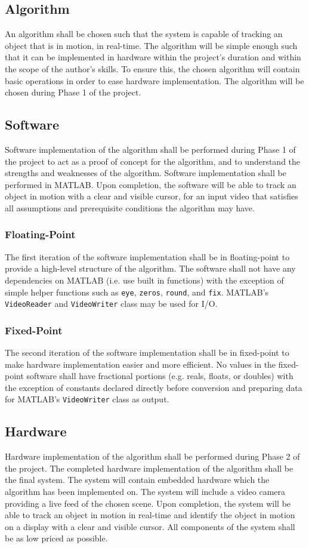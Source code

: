 \documentclass[11pt]{article} %
\begin{document}
\subsection{Algorithm}
An algorithm shall be chosen such that the system is capable of tracking an object that is in motion, in real-time. The algorithm will be simple enough such that it can be implemented in hardware within the project's duration and within the scope of the author's skills. To ensure this, the chosen algorithm will contain basic operations in order to ease hardware implementation. The algorithm will be chosen during Phase 1 of the project.
\subsection{Software}
Software implementation of the algorithm shall be performed during Phase 1 of the project to act as a proof of concept for the algorithm, and to understand the strengths and weaknesses of the algorithm. Software implementation shall be performed in MATLAB. Upon completion, the software will be able to track an object in motion with a clear and visible cursor, for an input video that satisfies all assumptions and prerequisite conditions the algorithm may have. 
\subsubsection{Floating-Point}
The first iteration of the software implementation shall be in floating-point to provide a high-level structure of the algorithm. The software shall not have any dependencies on MATLAB (i.e. use built in functions) with the exception of simple helper functions such as \texttt{eye}, \texttt{zeros}, \texttt{round}, and \texttt{fix}. MATLAB's \texttt{VideoReader} and \texttt{VideoWriter} class may be used for I/O.
\subsubsection{Fixed-Point}
The second iteration of the software implementation shall be in fixed-point to make hardware implementation easier and more efficient. No values in the fixed-point software shall have fractional portions (e.g. reals, floats, or doubles) with the exception of constants declared directly before conversion and preparing data for MATLAB's \texttt{VideoWriter} class as output.
\subsection{Hardware}
Hardware implementation of the algorithm shall be performed during Phase 2 of the project. The completed hardware implementation of the algorithm shall be the final system. The system will contain embedded hardware which the algorithm has been implemented on. The system will include a video camera providing a live feed of the chosen scene. Upon completion, the system will be able to track an object in motion in real-time and identify the object in motion on a display with a clear and visible cursor. All components of the system shall be as low priced as possible.
\end{document}
